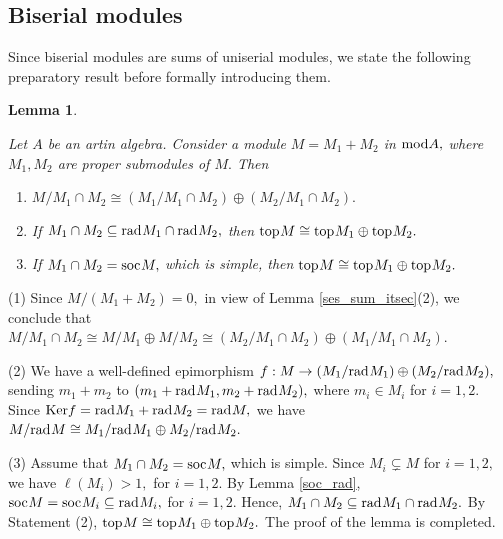\documentclass[10pt]{amsart}
\newtheorem{Lemma}[Theo]{Lemma}
\theoremstyle{definition}
\newcommand{\mmod}{{\rm mod}}
\newcommand{\rad}{{\rm rad}\hspace{.5pt}}
\newcommand{\soc}{{\rm soc}\hspace{.5pt}}
\newcommand{\ntop}{{\rm top}\hspace{.5pt}}
\newcommand{\Ker}{{\rm Ker}}
\newcommand{\vp}{\vspace{.5pt}}
\begin{document}
\subsection{\sc Biserial modules} Since biserial modules are sums of uniserial modules, we state the following preparatory result before formally introducing them.

\begin{Lemma}\label{ses_sum_2}

Let $A$ be an artin algebra. Consider a module $M=M_1+M_2$ in $\mmod A,$ where $M_1, M_2$ are proper submodules of $M.$ Then

\begin{enumerate}[$(1)$]

\vspace{-1.2pt}

\item $M/M_1\cap M_2 \cong \left(M_1/M_1\cap M_2\right)\oplus \left(M_2/M_1\cap M_2\right).$ 

\vp

\item If $M_1\cap M_2 \subseteq \rad M_1 \cap \rad M_2,$ then $\ntop M \cong \ntop M_1\oplus \ntop M_2.$

\item If $M_1\cap M_2=\soc M,$ which is simple, then $\ntop M\cong \ntop M_1\oplus \ntop M_2.$ 

\end{enumerate} \end{Lemma}

\vspace{-1.5pt}

 (1) Since $M/(M_1+M_2)=0,$ in view of Lemma \ref{ses_sum_itsec}(2), we conclude that $M/M_1\cap M_2\cong M/M_1 \oplus M/M_2 \cong (M_2/M_1\cap M_2)  \oplus (M_1/M_1\cap M_2).$

(2) We have a well-defined epimorphism $f: M \to (M_1/\rad M_1) \oplus (M_2/\rad M_2),$ sending $m_1+m_2$ to $(m_1 + \rad M_1, m_2+\rad M_2),$ where $m_i\in M_i$ for $i=1,2.$ Since $\Ker f=\rad M_1+\rad M_2=\rad M,$ we have $M/\rad M\cong M_1/\rad M_1 \oplus M_2/\rad M_2.$ 

(3) Assume that $M_1\cap M_2=\soc M,$ which is simple.
Since $M_i\subsetneq M$ for $i=1, 2,$ we have $\ell(M_i)>1,$ for $i=1, 2$. By Lemma \ref{soc_rad}, $\soc M=\soc M_i\subseteq \rad M_i,$ for $i=1, 2$. Hence, $M_1\cap M_2\subseteq \rad M_1\cap \rad M_2.$ By Statement (2), $\ntop M\cong \ntop M_1\oplus \ntop M_2.$ 
The proof of the lemma is completed.
\end{document}
